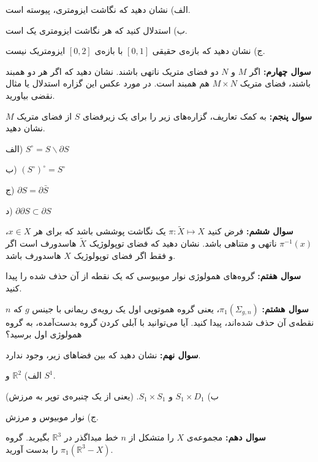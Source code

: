 \documentclass{article}
\begin{document}
		\noindent
		الف) نشان دهید که نگاشت ایزومتری، پیوسته است.
		
		\noindent
		ب) استدلال کنید که هر نگاشت ایزومتری یک 
		است.
		
		\noindent
		ج) نشان دهید که بازه‌ی حقیقی
		$[0,1]$
		 با بازه‌ی 
		 $[0,2]$
		 ایزومتریک نیست.
		 
		\endline
		
				\noindent
		\textbf{سوال چهارم:}
		اگر $M$ و $N$ دو فضای متریک ناتهی باشند. نشان دهید که اگر هر دو همبند
		باشند، فضای متریک 
		$M\times N$ هم همبند است.
		در مورد عکس این گزاره استدلال یا مثال نقضی بیاورید.
		
			\endline
			
							\noindent
			\textbf{سوال پنجم:}
			به کمک تعاریف، گزاره‌های زیر را برای یک زیرفضای $S$ از فضای متریک $M$ نشان دهید.
			
			\noindent
			الف)
			$S^{\circ} = S\backslash \partial S$
			
			\noindent
			ب) 
			$(S^{\circ})^\circ = S^{\circ}$
			
			\noindent
			ج)
			$\partial S = \partial \bar{S}$
			
			 \noindent
			 د)
			 $\partial\partial S \subset \partial S$
			
			
			
			
			\endline
			
			
							\noindent
			\textbf{سوال ششم:}
			فرض کنید
			$\pi: \tilde{X} \longmapsto X$
			یک نگاشت پوششی باشد که
			برای هر $x\in X$، 
			$\pi^{-1}(x)$
			ناتهی و متناهی باشد. نشان دهید که فضای توپولوژیک $\tilde{X}$ هاسدورف 
			است اگر و فقط اگر فضای توپولوژیک
			$X$
			هاسدورف باشد.
			
			\endline
			
			
							\noindent
			\textbf{سوال هفتم:}
			گروه‌های همولوژی نوار موبیوسی که یک نقطه از آن حذف شده را پیدا کنید.
			
			
			\endline
			
			\newpage
							\noindent
			\textbf{سوال هشتم:}
			$\pi_1(\Sigma_{g,n})$، یعنی 
			گروه هموتوپی اول یک رویه‌ی ریمانی با جینس $g$ که $n$ نقطه‌ی آن حذف شده‌اند، پیدا کنید. آیا می‌توانید با آبلی کردن گروه بدست‌آمده، به گروه‌ همولوژی اول برسید؟
			
			\endline
			
			
							\noindent
			\textbf{سوال نهم:}
			نشان دهید که بین فضاهای زیر،  
			وجود ندارد.
			
			\noindent
			الف) 
			$\mathbb{R}^2$
			و
			$S^1$.
			
			\noindent
			ب) 
			$S_1 \times D_1$
			و
			$S_1\times S_1$. 
			(یعنی از یک چنبره‌ی توپر به مرزش)

			\noindent
			ج) نوار موبیوس و مرزش.
			
			\endline
			
							\noindent
			\textbf{سوال دهم:}
			مجموعه‌ی 
			$X$ را متشکل از 
			$n$ خط مبداگذر در 
			$\mathbb{R}^3$
			بگیرید. گروه
			$\pi_1(\mathbb{R}^3-X)$
			را بدست آورید.
			
			\endline
\end{document}
